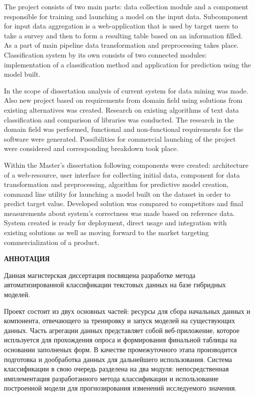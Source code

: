 The project consists of two main parts: data collection module and a compoment responsible for training and launching a model on the input data. Subcomponent for input data aggregation is a web-application that is used by target users to take a survey and then to form a resulting table based on an information filled. As a part of main pipeline data transformation and preprocessing takes place. Classification system by its own consists of two connected modules: implementation of a classification method and application for prediction using the model built.

In the scope of dissertation analysis of current system for data mining was made. Also new project based on requirements from domain field using solutions from existing alternatives was created. Research on existing algorithms of text data classification and comparison of libraries was conducted. The research in the domain field was performed, functional and non-functional requirements for the software were generated. Possibilities for commercial launching of the project were considered and corresponding breakdown took place.

Within the Master's dissertation following components were created: architecture of a web-resource, user interface for collecting initial data, component for data transformation and preprocessing, algorithm for predictive model creation, command line utility for launching a model built on the dataset in order to predict target value. Developed solution was compared to competitors and final measurements about system's correctness was made based on reference data. System created is ready for deployment, direct usage and integration with existing solutions as well as moving forward to the market targeting commercialization of a product.

\newapage
\begin{center}
	\textbf{\uppercase{Аннотация}}
\end{center}

Данная магистерская диссертация посвящена разработке метода автоматизированной классификации текстовых данных на базе гибридных моделей.

Проект состоит из двух основных частей: ресурсы для сбора начальных данных и компонента, отвечающего за тренировку и запуск моделей на существующих данных. Часть агрегации данных представляет собой веб-приложение, которое испльзуется для прохождения опроса и формирования финальной таблицы на основании заполненых форм. В качестве промежуточного этапа производится подготовка и дообработка данных для дальнейшего использования. Система классификации в свою очередь разделена на два модуля: непосредственная имплементация разработанного метода классификации и использование построенной модели для прогнозирования изменений исследуемого значения.

